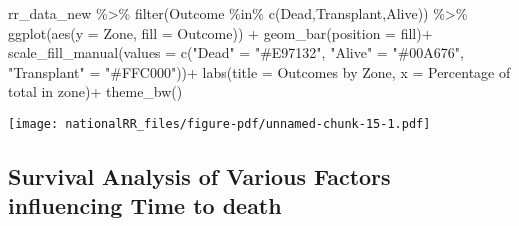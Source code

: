 \documentclass[
  letterpaper,
  DIV=11,
  numbers=noendperiod]{scrartcl}
\newenvironment{Shaded}{\begin{snugshade}}{\end{snugshade}}
\newcommand{\AttributeTok}[1]{\textcolor[rgb]{0.40,0.45,0.13}{#1}}
\newcommand{\FunctionTok}[1]{\textcolor[rgb]{0.28,0.35,0.67}{#1}}
\newcommand{\NormalTok}[1]{\textcolor[rgb]{0.00,0.23,0.31}{#1}}
\newcommand{\OtherTok}[1]{\textcolor[rgb]{0.00,0.23,0.31}{#1}}
\newcommand{\SpecialCharTok}[1]{\textcolor[rgb]{0.37,0.37,0.37}{#1}}
\newcommand{\StringTok}[1]{\textcolor[rgb]{0.13,0.47,0.30}{#1}}
\begin{document}
\begin{Shaded}
\begin{Highlighting}[]
\NormalTok{rr\_data\_new }\SpecialCharTok{\%\textgreater{}\%} 
  \FunctionTok{filter}\NormalTok{(Outcome }\SpecialCharTok{\%in\%} \FunctionTok{c}\NormalTok{(}\StringTok{\textquotesingle{}Dead\textquotesingle{}}\NormalTok{,}\StringTok{\textquotesingle{}Transplant\textquotesingle{}}\NormalTok{,}\StringTok{\textquotesingle{}Alive\textquotesingle{}}\NormalTok{)) }\SpecialCharTok{\%\textgreater{}\%}
  \FunctionTok{ggplot}\NormalTok{(}\FunctionTok{aes}\NormalTok{(}\AttributeTok{y =}\NormalTok{ Zone, }\AttributeTok{fill =}\NormalTok{ Outcome)) }\SpecialCharTok{+}
  \FunctionTok{geom\_bar}\NormalTok{(}\AttributeTok{position =} \StringTok{\textquotesingle{}fill\textquotesingle{}}\NormalTok{)}\SpecialCharTok{+}
  \FunctionTok{scale\_fill\_manual}\NormalTok{(}\AttributeTok{values =} \FunctionTok{c}\NormalTok{(}\StringTok{"Dead"} \OtherTok{=} \StringTok{"\#E97132"}\NormalTok{,}
                              \StringTok{"Alive"} \OtherTok{=} \StringTok{"\#00A676"}\NormalTok{,}
                              \StringTok{"Transplant"} \OtherTok{=} \StringTok{"\#FFC000"}\NormalTok{))}\SpecialCharTok{+}
  \FunctionTok{labs}\NormalTok{(}\AttributeTok{title =} \StringTok{\textquotesingle{}Outcomes by Zone\textquotesingle{}}\NormalTok{,}
       \AttributeTok{x =} \StringTok{\textquotesingle{}Percentage of total in zone\textquotesingle{}}\NormalTok{)}\SpecialCharTok{+}
  \FunctionTok{theme\_bw}\NormalTok{()}
\end{Highlighting}
\end{Shaded}

\texttt{[image: nationalRR\_files/figure-pdf/unnamed-chunk-15-1.pdf]}

\subsection{Survival Analysis of Various Factors influencing Time to
death}\label{survival-analysis-of-various-factors-influencing-time-to-death}
\end{document}
